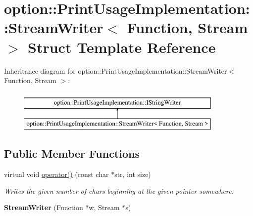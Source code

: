 \hypertarget{structoption_1_1_print_usage_implementation_1_1_stream_writer}{}\section{option\+:\+:Print\+Usage\+Implementation\+:\+:Stream\+Writer$<$ Function, Stream $>$ Struct Template Reference}
\label{structoption_1_1_print_usage_implementation_1_1_stream_writer}
Inheritance diagram for option\+:\+:Print\+Usage\+Implementation\+:\+:Stream\+Writer$<$ Function, Stream $>$\+:\begin{figure}[H]
\begin{center}
\leavevmode
\includegraphics[height=2.000000cm]{structoption_1_1_print_usage_implementation_1_1_stream_writer}
\end{center}
\end{figure}
\subsection*{Public Member Functions}
\begin{DoxyCompactItemize}
\item 
\mbox{\label{structoption_1_1_print_usage_implementation_1_1_stream_writer_ae39bc6378c22d24a490104b7764c37b7}} 
virtual void \hyperlink{structoption_1_1_print_usage_implementation_1_1_stream_writer_ae39bc6378c22d24a490104b7764c37b7}{operator()} (const char $\ast$str, int size)
\begin{DoxyCompactList}\small\item\em Writes the given number of chars beginning at the given pointer somewhere. \end{DoxyCompactList}\item 
\mbox{\label{structoption_1_1_print_usage_implementation_1_1_stream_writer_aa6ab48848dcbeb9e2cbde5d05ec35005}} 
{\bfseries Stream\+Writer} (Function $\ast$w, Stream $\ast$s)
\end{DoxyCompactItemize}
